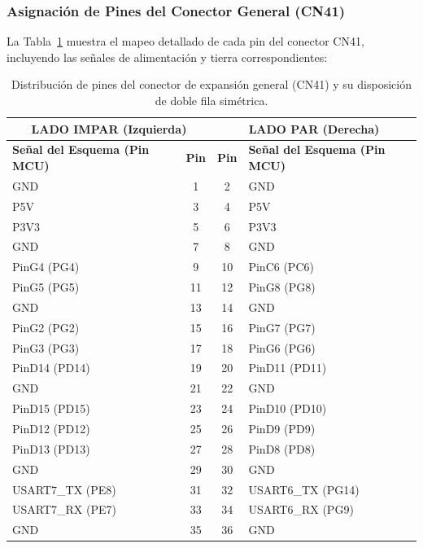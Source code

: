 \documentclass[12pt,a4paper]{article}
\begin{document}
\subsubsection{Asignación de Pines del Conector General (CN41)}

La Tabla~\ref{tab:conectores_pines} muestra el mapeo detallado de cada pin del conector CN41, incluyendo las señales de alimentación y tierra correspondientes:

\begin{table}[H]
\centering
\small
\begin{tabularx}{\textwidth}{|X|c|c|X|}
\hline
\multicolumn{2}{|c|}{\textbf{LADO IMPAR (Izquierda)}} & \multicolumn{2}{c|}{\textbf{LADO PAR (Derecha)}} \\ \hline
\textbf{Señal del Esquema (Pin MCU)} & \textbf{Pin} & \textbf{Pin} & \textbf{Señal del Esquema (Pin MCU)} \\ \hline
GND & 1 & 2 & GND \\ \hline
P5V & 3 & 4 & P5V \\ \hline
P3V3 & 5 & 6 & P3V3 \\ \hline
GND & 7 & 8 & GND \\ \hline
PinG4 (PG4) & 9 & 10 & PinC6 (PC6) \\ \hline
PinG5 (PG5) & 11 & 12 & PinG8 (PG8) \\ \hline
GND & 13 & 14 & GND \\ \hline
PinG2 (PG2) & 15 & 16 & PinG7 (PG7) \\ \hline
PinG3 (PG3) & 17 & 18 & PinG6 (PG6) \\ \hline
PinD14 (PD14) & 19 & 20 & PinD11 (PD11) \\ \hline
GND & 21 & 22 & GND \\ \hline
PinD15 (PD15) & 23 & 24 & PinD10 (PD10) \\ \hline
PinD12 (PD12) & 25 & 26 & PinD9 (PD9) \\ \hline
PinD13 (PD13) & 27 & 28 & PinD8 (PD8) \\ \hline
GND & 29 & 30 & GND \\ \hline
USART7\_TX (PE8) & 31 & 32 & USART6\_TX (PG14) \\ \hline
USART7\_RX (PE7) & 33 & 34 & USART6\_RX (PG9) \\ \hline
GND & 35 & 36 & GND \\ \hline
\end{tabularx}
\caption{Distribución de pines del conector de expansión general (CN41) y su disposición de doble fila simétrica.}
\label{tab:conectores_pines}
\end{table}
\end{document}
